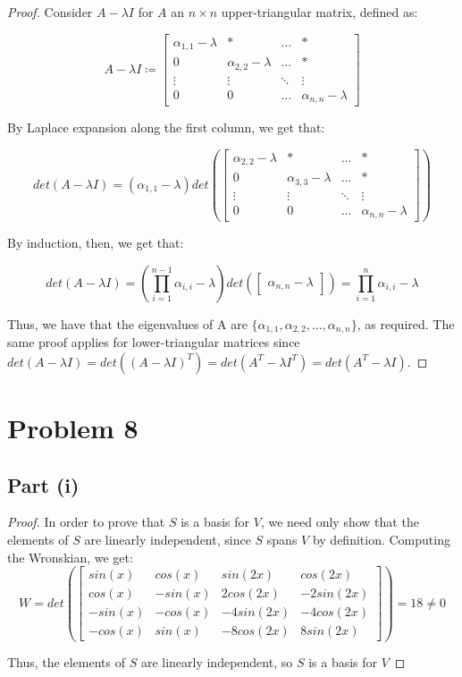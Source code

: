 \documentclass{article}
\begin{document}
\begin{proof}
Consider $A - \lambda I$ for $A$ an $n \times n$ upper-triangular matrix, defined as:

$$A - \lambda I \coloneqq \begin{bmatrix} \alpha_{1, 1} - \lambda & * & \dots & * \\
0 & \alpha_{2, 2} - \lambda & \dots & * \\
\vdots & \vdots & \ddots & \vdots \\
0 & 0 & \dots & \alpha_{n, n} - \lambda \end{bmatrix} $$

By Laplace expansion along the first column, we get that:

$$det(A - \lambda I) = (\alpha_{1, 1} - \lambda)det\left(\begin{bmatrix} \alpha_{2, 2} - \lambda & * & \dots & * \\
0 & \alpha_{3, 3} - \lambda & \dots & * \\
\vdots & \vdots & \ddots & \vdots \\
0 & 0 & \dots & \alpha_{n, n} - \lambda \end{bmatrix}\right)$$

By induction, then, we get that:

$$det(A - \lambda I) =  \left(\prod\limits_{i=1}^{n - 1}\alpha_{i, i} - \lambda \right)det(\begin{bmatrix}\alpha_{n, n} - \lambda \end{bmatrix}) = \prod\limits_{i=1}^{n}\alpha_{i, i} - \lambda$$

Thus, we have that the eigenvalues of A are $\{\alpha_{1, 1}, \alpha_{2, 2}, \dots, \alpha_{n, n}\}$, as required.
The same proof applies for lower-triangular matrices since $det(A - \lambda I) = det((A - \lambda I)^{T}) = det(A^{T} - \lambda I^{T}) = det(A^{T} - \lambda I)$.
\end{proof}


\section*{Problem 8}

\subsection*{Part (i)}

\begin{proof}
In order to prove that $S$ is a basis for $V$, we need only show that the elements of $S$ are linearly independent, since $S$ spans $V$ by definition. Computing the Wronskian, we get:
$$W = det\left(\begin{bmatrix} sin(x) & cos(x) & sin(2x) & cos(2x) \\ cos(x) & -sin(x) & 2cos(2x) & -2sin(2x) \\ -sin(x) & -cos(x) & -4sin(2x) & -4cos(2x) \\ -cos(x) & sin(x) & -8cos(2x) & 8sin(2x) \end{bmatrix}\right) = 18 \ne 0$$

Thus, the elements of $S$ are linearly independent, so $S$ is a basis for $V$
\end{proof}
\end{document}
